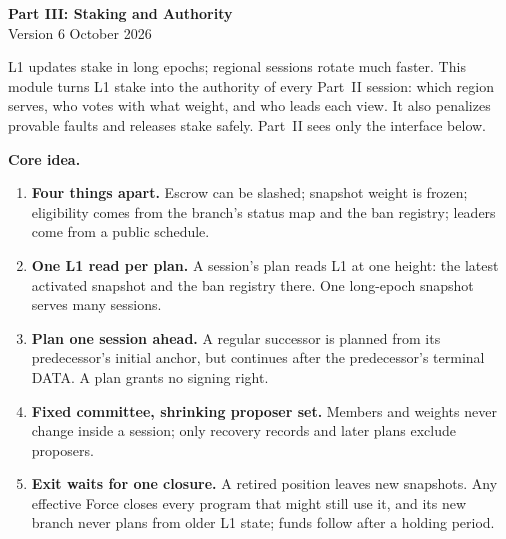 \documentclass[11pt,a4paper]{article}
\begin{document}
\begin{center}
{\Large\bfseries Part III: Staking and Authority}\\[3pt]
{\small Version 6  October 2026}
\end{center}

L1 updates stake in long epochs; regional sessions rotate much faster.
This module turns L1 stake into the authority of every Part~II session:
which region serves, who votes with what weight, and who leads each view.
It also penalizes provable faults and releases stake safely. Part~II sees
only the interface below.

\begin{mdframed}[linewidth=.6pt,innertopmargin=5pt,innerbottommargin=5pt]
\textbf{Core idea.}
\begin{enumerate}[label=\textbf{\arabic*.},itemsep=2pt]
\item \textbf{Four things apart.} Escrow can be slashed; snapshot weight
is frozen; eligibility comes from the branch's status map and the ban
registry; leaders come from a public schedule.
\item \textbf{One L1 read per plan.} A session's plan reads L1 at one
height: the latest activated snapshot and the ban registry there. One
long-epoch snapshot serves many sessions.
\item \textbf{Plan one session ahead.} A regular successor is planned
from its predecessor's initial anchor, but continues after the
predecessor's terminal DATA. A plan grants no signing right.
\item \textbf{Fixed committee, shrinking proposer set.} Members and
weights never change inside a session; only recovery records and later
plans exclude proposers.
\item \textbf{Exit waits for one closure.} A retired position leaves new
snapshots. Any effective Force closes every program that might still use
it, and its new branch never plans from older L1 state; funds follow after
a holding period.
\end{enumerate}
\end{mdframed}
\end{document}

